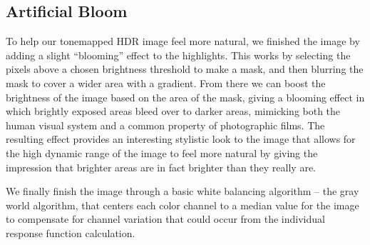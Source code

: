 \documentclass[
	a4paper, %
	10pt, %
	unnumberedsections, %
	twoside, %
]{LTJournalArticle}
\begin{document}
\subsection{Artificial Bloom}

To help our tonemapped HDR image feel more natural, we finished the image by adding a slight “blooming” effect to the highlights. This works by selecting the pixels above a chosen brightness threshold to make a mask, and then blurring the mask to cover a wider area with a gradient. From there we can boost the brightness of the image based on the area of the mask, giving a blooming effect in which brightly exposed areas bleed over to darker areas, mimicking both the human visual system and a common property of photographic films. The resulting effect provides an interesting stylistic look to the image that allows for the high dynamic range of the image to feel more natural by giving the impression that brighter areas are in fact brighter than they really are.

We finally finish the image through a basic white balancing algorithm – the gray world algorithm, that centers each color channel to a median value for the image to compensate for channel variation that could occur from the individual response function calculation.





\end{document}
